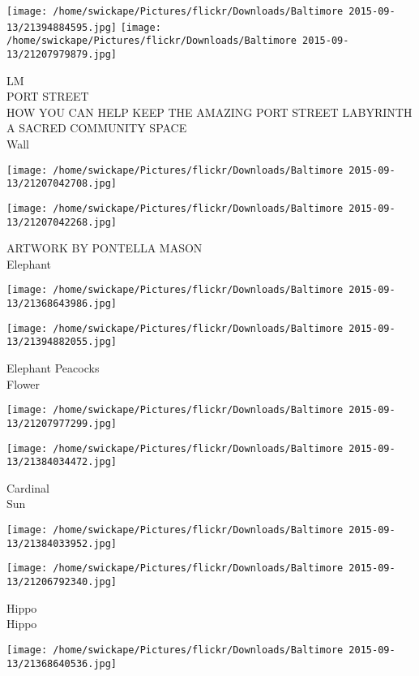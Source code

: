 \documentclass[10pt,letterpaper]{article}
\begin{document}
\texttt{[image: /home/swickape/Pictures/flickr/Downloads/Baltimore 2015-09-13/21394884595.jpg]}
\texttt{[image: /home/swickape/Pictures/flickr/Downloads/Baltimore 2015-09-13/21207979879.jpg]}

LM\\
PORT STREET\\
HOW YOU CAN HELP KEEP THE AMAZING PORT STREET LABYRINTH A SACRED COMMUNITY SPACE\\
Wall
\pagebreak

\texttt{[image: /home/swickape/Pictures/flickr/Downloads/Baltimore 2015-09-13/21207042708.jpg]}

\vspace{0.25in}
\texttt{[image: /home/swickape/Pictures/flickr/Downloads/Baltimore 2015-09-13/21207042268.jpg]}

ARTWORK BY PONTELLA MASON\\
Elephant
\pagebreak

\texttt{[image: /home/swickape/Pictures/flickr/Downloads/Baltimore 2015-09-13/21368643986.jpg]}

\vspace{0.25in}
\texttt{[image: /home/swickape/Pictures/flickr/Downloads/Baltimore 2015-09-13/21394882055.jpg]}

Elephant Peacocks\\
Flower
\pagebreak

\texttt{[image: /home/swickape/Pictures/flickr/Downloads/Baltimore 2015-09-13/21207977299.jpg]}

\vspace{0.25in}
\texttt{[image: /home/swickape/Pictures/flickr/Downloads/Baltimore 2015-09-13/21384034472.jpg]}

Cardinal\\
Sun
\pagebreak

\texttt{[image: /home/swickape/Pictures/flickr/Downloads/Baltimore 2015-09-13/21384033952.jpg]}

\vspace{0.25in}
\texttt{[image: /home/swickape/Pictures/flickr/Downloads/Baltimore 2015-09-13/21206792340.jpg]}

Hippo\\
Hippo
\pagebreak

\texttt{[image: /home/swickape/Pictures/flickr/Downloads/Baltimore 2015-09-13/21368640536.jpg]}
\end{document}
